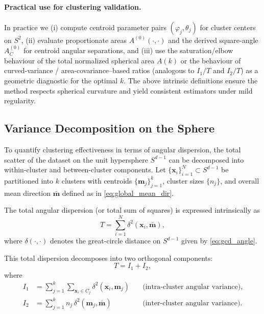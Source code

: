 \documentclass[12pt,a4paper]{report}
\begin{document}
\paragraph{Practical use for clustering validation.}
In practice we (i) compute centroid parameter pairs $(\varphi_j,\theta_j)$ for cluster centers on $S^2$, 
(ii) evaluate proportionate areas $A^{(0)}(\cdot,\cdot)$ and the derived square-angle $A^{(0)}_C$ for centroid angular separations, and 
(iii) use the saturation/elbow behaviour of the total normalized spherical area $A(k)$ or the behaviour of curved-variance / area-covariance–based ratios 
(analogous to $I_1/T$ and $I_2/T$) as a geometric diagnostic for the optimal $k$. 
The above intrinsic definitions ensure the method respects spherical curvature and yield consistent estimators under mild regularity.

\subsection{Variance Decomposition on the Sphere}
To quantify clustering effectiveness in terms of angular dispersion, the total scatter of the dataset 
on the unit hypersphere $S^{d-1}$ can be decomposed into within-cluster and between-cluster components.  
Let $\{\mathbf{x}_i\}_{i=1}^{N} \subset S^{d-1}$ be partitioned into $k$ clusters with centroids 
$\{\mathbf{m}_j\}_{j=1}^{k}$, cluster sizes $\{n_j\}$, and overall mean direction $\bar{\mathbf{m}}$ 
defined as in \eqref{eq:global_mean_dir}.  

The total angular dispersion (or total sum of squares) is expressed intrinsically as
\begin{equation}
T = \sum_{i=1}^{N} \delta^{2}(\mathbf{x}_i, \bar{\mathbf{m}}),
\label{eq:total_dispersion}
\end{equation}
where $\delta(\cdot,\cdot)$ denotes the great-circle distance on $S^{d-1}$ given by \eqref{eq:gcd_angle}.  

This total dispersion decomposes into two orthogonal components:
\begin{equation}
T = I_1 + I_2,
\label{eq:variance_decomp}
\end{equation}
where
\begin{align}
I_1 &= \sum_{j=1}^{k}\sum_{\mathbf{x}_i \in C_j} 
\delta^{2}(\mathbf{x}_i, \mathbf{m}_j)
\quad &\text{(intra-cluster angular variance)},  \label{eq:within_var}\\[4pt]
I_2 &= \sum_{j=1}^{k} n_j\,\delta^{2}(\mathbf{m}_j, \bar{\mathbf{m}})
\quad &\text{(inter-cluster angular variance)}. \label{eq:between_var}
\end{align}
\end{document}
